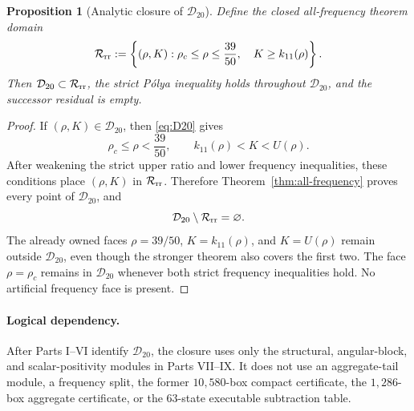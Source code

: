 \documentclass[11pt]{article}
\newtheorem{proposition}[theorem]{Proposition}
\newcommand{\Dc}{\mathcal D_{20}}
\newcommand{\Rrr}{\mathcal R_{\rm rr}}
\begin{document}
\begin{proposition}[Analytic closure of \(\mathcal D_{20}\)]
\label{prop:closure}
Define the closed all-frequency theorem domain
\[
 \Rrr:=\left\{(\rho,K):
 \rho_c\leq\rho\leq\frac{39}{50},\quad
 K\geq k_{11}(\rho)\right\}.
\]
Then \(\Dc\subset\Rrr\), the strict P\'olya inequality holds throughout
\(\Dc\), and the successor residual is empty.
\end{proposition}

\begin{proof}
If \((\rho,K)\in\Dc\), then \eqref{eq:D20} gives
\[
 \rho_c\leq\rho<\frac{39}{50},
 \qquad
 k_{11}(\rho)<K<U(\rho).
\]
After weakening the strict upper ratio and lower frequency inequalities,
these conditions place \((\rho,K)\) in \(\Rrr\).  Therefore
Theorem~\ref{thm:all-frequency} proves every point of \(\Dc\), and
\[
 \Dc\setminus\Rrr=\varnothing.
\]
The already owned faces \(\rho=39/50\), \(K=k_{11}(\rho)\), and
\(K=U(\rho)\) remain outside \(\Dc\), even though the stronger theorem
also covers the first two.  The face \(\rho=\rho_c\) remains in \(\Dc\)
whenever both strict frequency inequalities hold.  No artificial
frequency face is present.
\end{proof}

\paragraph{Logical dependency.}
After Parts I--VI identify \(\mathcal D_{20}\), the closure uses only the
structural, angular-block, and scalar-positivity modules in Parts VII--IX.
It does not use an aggregate-tail module, a frequency split, the former
\(10{,}580\)-box compact certificate, the \(1{,}286\)-box aggregate
certificate, or the \(63\)-state executable subtraction table.
\end{document}
